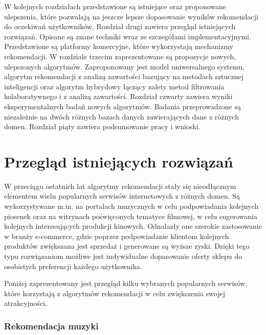 \documentclass[twoside]{iisthesis}
\begin{document}
	 W kolejnych rozdziałach przedstawione są istniejące oraz proponowane ulepszenia, które pozwalają na jeszcze lepsze dopasowanie wyników rekomendacji do oczekiwań użytkowników. Rozdział drugi zawiera przegląd istniejących rozwiązań. Opisane są znane techniki wraz ze szczegółami implementacyjnymi. Przedstawione są platformy komercyjne, które wykorzystają mechanizmy rekomendacji. W rozdziale trzecim zaprezentowane są propozycje nowych, ulepszonych algorytmów. Zaproponowany jest model uniwersalnego systemu, algorytm rekomendacji z analizą zawartości bazujący na metodach sztucznej inteligencji oraz algorytm hybrydowy łączący zalety metod filtrowania kolaboratywnego i z analizą zawartości. Rozdział czwarty zawiera wyniki eksperymentalnych badań nowych algorytmów. Badania przeprowadzone są niezależnie na dwóch różnych bazach danych zawierających dane z różnych domen. Rozdział piąty zawiera podsumowanie pracy i wnioski.
	 
 
 \chapter{Przegląd istniejących rozwiązań}

	 W przeciągu ostatnich lat algorytmy rekomendacji stały się nieodłącznym elementem wielu popularnych serwisów internetowych z różnych domen. Są wykorzystywane m.in. na portalach muzycznych w celu podpowiadania kolejnych piosenek oraz na witrynach poświęconych tematyce filmowej, w celu sugerowania kolejnych interesujących produkcji kinowych. Odnalazły one szerokie zastosowanie w branży e-commerce, gdzie poprzez podpowiadanie klientom kolejnych produktów zwiększana jest sprzedaż i generowane są wyższe zyski. Dzięki tego typu rozwiązaniom możliwe jest indywidualne dopasowanie oferty sklepu do osobistych preferencji każdego użytkownika. 
	 
	 Poniżej zaprezentowany jest przegląd kilku wybranych popularnych serwisów, które korzystają z algorytmów rekomendacji w celu zwiększenia swojej atrakcyjności.
	  
	 \subsection{Rekomendacja muzyki}
	 
\end{document}
